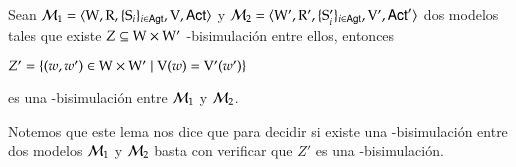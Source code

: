         
    
    

\begin{lema}
    Sean $\mathcal{M}_1=\langle \mathrm{W},\mathrm{R},\{ \mathrm{S}_i \}_{i \in {\rm \sf Agt}},\mathrm{V},{\rm \sf Act} \rangle$ y 
    $\mathcal{M}_2=\langle \mathrm{W}',\mathrm{R}',\{ \mathrm{S}_i' \}_{i \in {\rm \sf Agt}},\mathrm{V}',{\rm \sf Act}' \rangle$ dos modelos 
    tales que existe $Z \subseteq \mathrm{W} \times \mathrm{W}'$ \KHilogic-bisimulación entre ellos, entonces

    \begin{center}
        $Z' = \{(w,w') \in \mathrm{W} \times \mathrm{W}' \mid \mathrm{V}(w) = \mathrm{V}'(w')\}$
    \end{center}
    es una \KHilogic-bisimulación entre $\mathcal{M}_1$ y $\mathcal{M}_2$.
\end{lema}

Notemos que este lema nos dice que para decidir si existe una \KHilogic-bisimulación
entre dos modelos $\mathcal{M}_1$ y $\mathcal{M}_2$ basta con verificar que $Z'$ es una \KHilogic-bisimulación.

